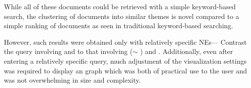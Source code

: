 While all of these documents could be retrieved with a simple keyword-based search, the clustering of documents into similar themes is novel compared to a simple ranking of documents as seen in traditional keyword-based searching.

However, such results were obtained only with relatively specific NEs--- Contrast the query involving  and  to that involving  ($\sim$ )  and . Additionally, even after entering a relatively specific query, much adjustment of the visualization settings was required to display an graph which was both of practical use to the user and was not overwhelming in size and complexity.

